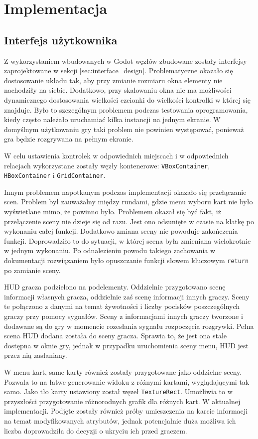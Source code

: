 \chapter{Implementacja}
\section{Interfejs użytkownika}
Z wykorzystaniem wbudowanych w Godot węzłów zbudowane zostały interfejsy zaprojektowane w sekcji \ref{sec:interface_design}. Problematyczne okazało się dostosowanie układu tak, aby przy zmianie rozmiaru okna elementy nie nachodziły na siebie. Dodatkowo, przy skalowaniu okna nie ma możliwości dynamicznego dostosowania wielkości czcionki do wielkości kontrolki w której się znajduje.  Było to szczególnym problemem podczas testowania oprogramowania, kiedy często należało uruchamiać kilka instancji na jednym ekranie. W domyślnym użytkowaniu gry taki problem nie powinien występować, ponieważ gra będzie rozgrywana na pełnym ekranie.

W celu ustawienia kontrolek w odpowiednich miejscach i w odpowiednich relacjach wykorzystane zostały węzły kontenerowe: \texttt{VBoxContainer}, \texttt{HBoxContainer} i \texttt{GridContainer}.

Innym problemem napotkanym podczas implementacji okazało się przełączanie scen. Problem był zauważalny między rundami, gdzie menu wyboru kart nie było wyświetlane mimo, że powinno było. Problemem okazał się być fakt, iż przełączenie sceny nie dzieje się od razu. Jest ono odsunięte w czasie na klatkę po wykonaniu całej funkcji. Dodatkowo zmiana sceny nie powoduje zakończenia funkcji. Doprowadziło to do sytuacji, w której scena była zmieniana wielokrotnie w jednym wykonaniu. Po odnalezieniu powodu takiego zachowania w dokumentacji rozwiązaniem było opuszczanie funkcji słowem kluczowym \texttt{return} po zamianie sceny.

HUD gracza podzielono na podelementy. Oddzielnie przygotowano scenę informacji własnych gracza, oddzielnie zaś scenę informacji innych graczy. Sceny te połączono z danymi na temat żywotności i liczby pocisków poszczególnych graczy przy pomocy sygnałów. Sceny z informacjami innych graczy tworzone i dodawane są do gry w momencie rozesłania sygnału rozpoczęcia rozgrywki. Pełna scena HUD dodana została do sceny gracza. Sprawia to, że jest ona stale dostępna w oknie gry, jednak w przypadku uruchomienia sceny menu, HUD jest przez nią zasłaniany.

W menu kart, same karty również zostały przygotowane jako oddzielne sceny. Pozwala to na łatwe generowanie widoku z różnymi kartami, wyglądającymi tak samo. Jako tło karty ustawiony został węzeł \texttt{TextureRect}. Umożliwia to w przyszłości przygotowanie różnorodnych grafik dla różnych kart. W aktualnej implementacji. Podjęte zostały również próby umieszczenia na karcie informacji na temat modyfikowanych atrybutów, jednak potencjalnie duża możliwa ich liczba doprowadziła do decyzji o ukryciu ich przed graczem.

